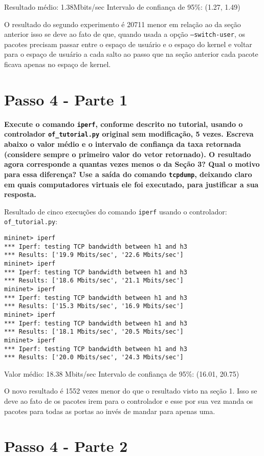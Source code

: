 \documentclass[12pt,letterpaper]{article}
\begin{document}
Resultado médio: 1.38Mbits/sec
Intervalo de confiança de 95\%: (1.27, 1.49)

O resultado do segundo experimento é 20711 menor em relação ao da seção anterior
isso se deve ao fato de que, quando usada a opção \texttt{--switch-user}, os pacotes
precisam passar entre o espaço de usuário e o espaço do kernel e voltar para o 
espaço de usuário a cada salto ao passo que na seção anterior cada pacote
ficava apenas no espaço de kernel.

\section{Passo 4 - Parte 1}

\textbf{Execute o comando \texttt{iperf}, conforme descrito no
tutorial, usando o controlador \texttt{of\_tutorial.py} original sem
modificação, 5 vezes. Escreva abaixo o valor médio e o intervalo de
confiança da taxa retornada (considere sempre o primeiro valor do
vetor retornado). O resultado agora
corresponde a quantas vezes menos o da Seção 3? Qual o motivo para
essa diferença? Use a saída do comando \texttt{tcpdump}, deixando
claro em quais computadores virtuais ele foi executado, para
justificar a sua resposta.}

Resultado de cinco execuções do comando \texttt{iperf} usando o controlador:
\texttt{of\_tutorial.py}:

\begin{verbatim}
mininet> iperf
*** Iperf: testing TCP bandwidth between h1 and h3
*** Results: ['19.9 Mbits/sec', '22.6 Mbits/sec']
mininet> iperf
*** Iperf: testing TCP bandwidth between h1 and h3
*** Results: ['18.6 Mbits/sec', '21.1 Mbits/sec']
mininet> iperf
*** Iperf: testing TCP bandwidth between h1 and h3
*** Results: ['15.3 Mbits/sec', '16.9 Mbits/sec']
mininet> iperf
*** Iperf: testing TCP bandwidth between h1 and h3
*** Results: ['18.1 Mbits/sec', '20.5 Mbits/sec']
mininet> iperf
*** Iperf: testing TCP bandwidth between h1 and h3
*** Results: ['20.0 Mbits/sec', '24.3 Mbits/sec']
\end{verbatim}

Valor médio: 18.38 Mbits/sec
Intervalo de confiança de 95\%: (16.01, 20.75)

O novo resultado é 1552 vezes menor do que o resultado visto na seção 1. Isso se
deve ao fato de os pacotes irem para o controlador e esse por sua vez manda os pacotes
para todas as portas ao invés de mandar para apenas uma.

\section{Passo 4 - Parte 2}
\end{document}

